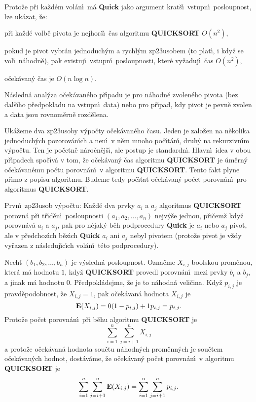 \documentclass[a4paper,12pt]{article}
\begin{document}
\flushpar Proto\v ze p\v ri ka\v zd\'em vol\'an\'\i\ m\'a {\bf Quick} jako 
argument krat\v s\'\i\ 
vstupn\'\i\ posloupnost, lze uk\'azat, \v ze:
\roster
\item{}p\v ri ka\v zd\'e volb\v e 
pivota je nejhor\v s\'\i\ \v cas algoritmu {\bf QUICKSORT} $O(n^2
)$,
\item{}pokud je pivot vybr\'an jedno\-du\-ch\'ym a rychl\'ym 
zp\accent23usobem (to plat\'\i , i kdy\v z se vol\'\i\ n\'ahodn\v e), pak 
exi\-stuj\'\i\ vstupn\'\i\ posloupnosti, kter\'e vy\v zaduj\'\i\ \v cas $
O(n^2)$,
\item{}o\v cek\'avan\'y \v cas je $O(n\log n)$.
\endroster
\medskip

\flushpar N\'asledn\'a anal\'y\-za o\v cek\'avan\'eho p\v r\'\i padu  
je pro n\'a\-hod\-n\v e zvolen\'eho pivota (bez dal\v s\'\i ho p\v red\-pokladu na 
vstupn\'\i\ data) nebo pro p\v r\'\i pad, kdy pivot je pevn\v e zvolen a data jsou 
rovno\-m\v ern\v e rozd\v e\-lena.
\medskip

\flushpar Uk\'a\v zeme dva zp\accent23usoby v\'ypo\v cty o\v cek\'avan\'eho \v casu.  Jeden 
je zalo\v zen na n\v ekolika jednoduch\'ych pozorov\'an\'\i ch a nen\'\i\ v 
n\v em mnoho po\v c\'\i t\'an\'\i , druh\'y na rekurzivn\'\i m v\'ypo\v ctu. Ten 
je po\v cetn\v e n\'aro\v cn\v ej\v s\'\i , ale postup je standardn\'\i . Hlavn\'\i\ idea v obou 
p\v r\'\i padech spo\v c\'\i v\'a v tom, \v ze  
o\v cek\'avan\'y \v cas algoritmu {\bf QUICKSORT} je \'um\v ern\'y 
o\v cek\'avan\'emu po\v ctu porovn\'an\'\i\ v algoritmu {\bf QUICKSORT}.
Tento fakt plyne p\v r\'\i mo z popisu algoritmu.  Budeme 
tedy po\v c\'\i tat  
o\v cek\'a\-van\'y po\v cet porovn\'an\'\i\ pro algoritmus {\bf QUICKSORT}.  
\medskip

\flushpar Prvn\'\i\ zp\accent23usob v\'ypo\v ctu:\newline 
Ka\v zd\'e dva prvky $a_i$ a $a_j$ algoritmus {\bf QUICKSORT} porovn\'a 
p\v ri t\v r\'\i d\v en\'\i\ posloupnosti $(a_1,a_2,\dots,a_n)$ nejv\'y\v se jednou, 
p\v ri\v cem\v z kdy\v z porovn\'av\'a $a_i$ a $a_j$, 
pak pro n\v ejak\'y b\v eh podprocedury {\bf Quick} je $a_i$ nebo $
a_j$ 
pivot, ale v p\v redchoz\'\i ch b\v ez\'\i ch {\bf Quick} $a_i$ ani $
a_j$ 
nebyl pivotem (proto\v ze pivot je v\v zdy vy\v razen z n\'asleduj\'\i c\'\i ch 
vol\'an\'\i\ t\'eto podprocedury).
\medskip

\flushpar Nech\v t $(b_1,b_2,\dots,b_n)$ je v\'ysledn\'a posloupnost.  
Ozna\v cme $X_{i,j}$ boolskou prom\v enou, kter\'a m\'a hodnotu $
1$, 
kdy\v z {\bf QUICKSORT} provedl porovn\'an\'\i\ mezi prvky $b_i$ a $
b_j$, a 
jinak m\'a hodnotu $0$.  P\v redpokl\'adejme, \v ze je to n\'ahodn\'a 
veli\v cina. Kdy\v z $p_{i,j}$ je prav\-d\v e\-podobnost, \v ze $
X_{i,j}=1$, 
pak o\v cek\'avan\'a hodnota $X_{i,j}$ je 
$$\bold E(X_{i,j})=0(1-p_{i,j})+1p_{i,j}=p_{i,j}.$$
Proto\v ze po\v cet porovn\'an\'\i\  p\v ri b\v ehu algoritmu {\bf QUICKSORT} je
$$\sum_{i=1}^n\sum_{j=i+1}^nX_{i,j}$$
a proto\v ze o\v cek\'avan\'a hodnota sou\v ctu n\'ahodn\'ych 
prom\v enn\'ych je sou\v ctem o\v cek\'avan\'ych hodnot, dost\'av\'ame, \v ze 
o\v cek\'avan\'y po\v cet porovn\'an\'\i\ v algoritmu {\bf QUICKSORT} je
$$\sum_{i=1}^n\sum_{j=i+1}^n\bold E(X_{i,j})=\sum_{i=1}^n\sum_{j=
i+1}^np_{i,j}.$$
\medskip
\end{document}
